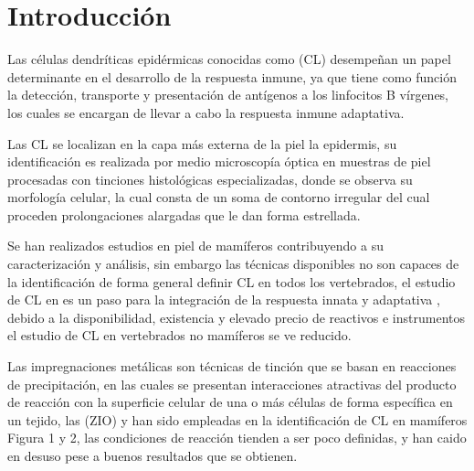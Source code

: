 \section*{Introducción}

Las células dendríticas epidérmicas conocidas como  (CL) desempeñan un papel determinante en el desarrollo de la respuesta inmune, ya que tiene como función la detección, transporte y presentación de antígenos a los linfocitos B vírgenes, los cuales se encargan de llevar a cabo la respuesta inmune adaptativa\cite{article:CL}.

Las CL se localizan en la capa más externa de la piel la epidermis, su identificación es realizada por medio microscopía óptica en muestras de piel procesadas con tinciones histológicas especializadas, donde se observa su morfología celular, la cual consta de un soma de contorno irregular del cual proceden prolongaciones alargadas que le dan forma estrellada.

Se han realizados estudios en piel de mamíferos contribuyendo a su caracterización y análisis, sin embargo las técnicas disponibles no son capaces de la identificación de forma general definir CL en todos los vertebrados, el estudio de CL en  es un paso para la integración de la respuesta innata y adaptativa \cite{article:vertebrados}, debido a la disponibilidad, existencia y elevado precio de reactivos e instrumentos el estudio de CL en vertebrados no mamíferos se ve reducido.

Las impregnaciones metálicas son técnicas de tinción que se basan en reacciones de precipitación, en las cuales se presentan interacciones atractivas del producto de reacción con la superficie celular de una o más células de forma específica en un tejido, las  (ZIO) \cite{article:ZIO} y  \cite{article:ClAu} han sido empleadas en la identificación de CL en mamíferos Figura 1 y 2, las condiciones de reacción tienden a ser poco definidas, y han caido en desuso pese a buenos resultados que se obtienen.

